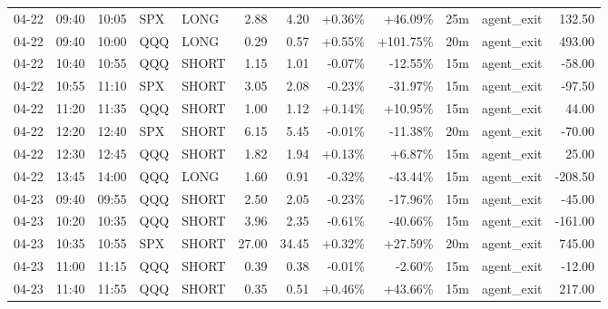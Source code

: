 \documentclass[11pt,a4paper]{article}
\begin{document}
\begin{center}
\begin{longtable}{>{\color{txtmain}}l l l l l r r r r r >{\color{txtmain}}l r}
04-22 & 09:40 & 10:05 & SPX & LONG & 2.88 & 4.20 & \textcolor{wingreen}{+0.36\%} & \textcolor{wingreen}{+46.09\%} & 25m & agent\_exit & \textcolor{wingreen}{132.50} \\
04-22 & 09:40 & 10:00 & QQQ & LONG & 0.29 & 0.57 & \textcolor{wingreen}{+0.55\%} & \textcolor{wingreen}{+101.75\%} & 20m & agent\_exit & \textcolor{wingreen}{493.00} \\
04-22 & 10:40 & 10:55 & QQQ & SHORT & 1.15 & 1.01 & \textcolor{lossred}{-0.07\%} & \textcolor{lossred}{-12.55\%} & 15m & agent\_exit & \textcolor{lossred}{-58.00} \\
04-22 & 10:55 & 11:10 & SPX & SHORT & 3.05 & 2.08 & \textcolor{lossred}{-0.23\%} & \textcolor{lossred}{-31.97\%} & 15m & agent\_exit & \textcolor{lossred}{-97.50} \\
04-22 & 11:20 & 11:35 & QQQ & SHORT & 1.00 & 1.12 & \textcolor{wingreen}{+0.14\%} & \textcolor{wingreen}{+10.95\%} & 15m & agent\_exit & \textcolor{wingreen}{44.00} \\
04-22 & 12:20 & 12:40 & SPX & SHORT & 6.15 & 5.45 & \textcolor{lossred}{-0.01\%} & \textcolor{lossred}{-11.38\%} & 20m & agent\_exit & \textcolor{lossred}{-70.00} \\
04-22 & 12:30 & 12:45 & QQQ & SHORT & 1.82 & 1.94 & \textcolor{wingreen}{+0.13\%} & \textcolor{wingreen}{+6.87\%} & 15m & agent\_exit & \textcolor{wingreen}{25.00} \\
04-22 & 13:45 & 14:00 & QQQ & LONG & 1.60 & 0.91 & \textcolor{lossred}{-0.32\%} & \textcolor{lossred}{-43.44\%} & 15m & agent\_exit & \textcolor{lossred}{-208.50} \\
04-23 & 09:40 & 09:55 & QQQ & SHORT & 2.50 & 2.05 & \textcolor{lossred}{-0.23\%} & \textcolor{lossred}{-17.96\%} & 15m & agent\_exit & \textcolor{lossred}{-45.00} \\
04-23 & 10:20 & 10:35 & QQQ & SHORT & 3.96 & 2.35 & \textcolor{lossred}{-0.61\%} & \textcolor{lossred}{-40.66\%} & 15m & agent\_exit & \textcolor{lossred}{-161.00} \\
04-23 & 10:35 & 10:55 & SPX & SHORT & 27.00 & 34.45 & \textcolor{wingreen}{+0.32\%} & \textcolor{wingreen}{+27.59\%} & 20m & agent\_exit & \textcolor{wingreen}{745.00} \\
04-23 & 11:00 & 11:15 & QQQ & SHORT & 0.39 & 0.38 & \textcolor{lossred}{-0.01\%} & \textcolor{lossred}{-2.60\%} & 15m & agent\_exit & \textcolor{lossred}{-12.00} \\
04-23 & 11:40 & 11:55 & QQQ & SHORT & 0.35 & 0.51 & \textcolor{wingreen}{+0.46\%} & \textcolor{wingreen}{+43.66\%} & 15m & agent\_exit & \textcolor{wingreen}{217.00} \\

\end{longtable}
\end{center}
\end{document}
